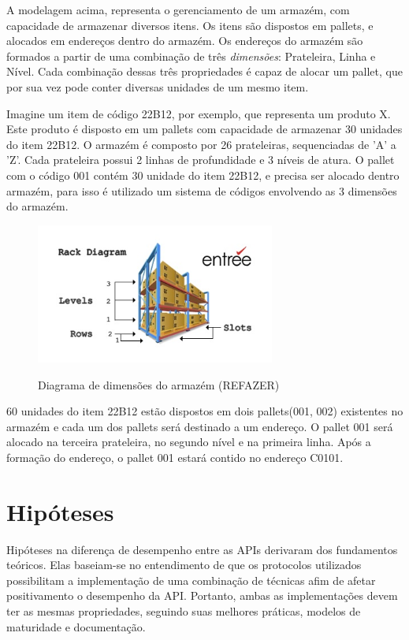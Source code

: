 A modelagem acima, representa o gerenciamento de um armazém, com capacidade de armazenar diversos itens. Os itens são dispostos em pallets, e alocados em endereços dentro do armazém. Os endereços do armazém são formados a partir de uma combinação de três \textit{dimensões}: Prateleira, Linha e Nível. Cada combinação dessas três propriedades é capaz de alocar um pallet, que por sua vez pode conter diversas unidades de um mesmo item.

Imagine um item de código 22B12, por exemplo, que representa um produto X. Este produto é disposto em um pallets com capacidade de armazenar 30 unidades do item 22B12. O armazém é composto por 26 prateleiras, sequenciadas de 'A' a 'Z'. Cada prateleira possui 2 linhas de profundidade e  3 níveis de atura. O pallet com o código 001 contém 30 unidade do item 22B12, e precisa ser alocado dentro armazém, para isso é utilizado um sistema de códigos envolvendo as 3 dimensões do armazém.


\begin{figure}[htbp]
\centering
\includegraphics[width=0.7\textwidth]{figuras/rack.jpg}
\label{fig:rack}
\caption{Diagrama de dimensões do armazém (REFAZER)}
\author{fonte: Autor}
\end{figure}

60 unidades do item 22B12 estão dispostos em dois pallets(001, 002) existentes no armazém e cada um dos pallets será destinado a um endereço. O pallet 001 será alocado na terceira prateleira, no segundo nível e na primeira linha. Após a formação do endereço, o pallet 001 estará contido no endereço C0101.  

\section{Hipóteses} \label{sechHipóteses}

Hipóteses na diferença de desempenho entre as APIs derivaram dos fundamentos teóricos. Elas baseiam-se no entendimento de que os protocolos utilizados possibilitam a implementação de uma combinação de técnicas afim de afetar positivamento o desempenho da API. Portanto, ambas as implementações devem ter as mesmas propriedades, seguindo suas melhores práticas, modelos de maturidade e documentação.

